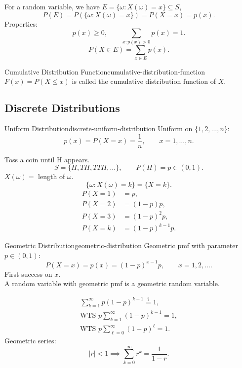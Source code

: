 For a random variable, we have $E=\{\omega:X(\omega)=x\}\subseteq S$,
\[
  P(E)=P(\{\omega:X(\omega)=x\})=P(X=x)=p(x).
\]
Properties:
\[
  p(x)\ge0,\qquad\sum_{x:p(x)>0}p(x)=1.
\]
\[
  P(X\in E)=\sum_{x\in E}p(x).
\]

\begin{definition}{Cumulative Distribution Function}{cumulative-distribution-function}
  $F(x)=P(X\le x)$ is called the cumulative distribution function of $X$.
\end{definition}

\subsection{Discrete Distributions}

\begin{definition}{Uniform Distribution}{discrete-uniform-distribution}
  Uniform on $\{1,2,\ldots,n\}$:
  \[
    p(x)=P(X=x)=\frac1n,\qquad x=1,\ldots,n.
  \]
\end{definition}

\begin{example}
  Toss a coin until H appears.
  \[
    S=\{H,TH,TTH,\ldots\},\qquad P(H)=p\in(0,1).
  \]
  $X(\omega)=$ length of $\omega$.
  \[
    \{\omega:X(\omega)=k\}=\{X=k\}.
  \]
  \begin{align*}
    P(X=1) & =p,            \\
    P(X=2) & =(1-p)p,       \\
    P(X=3) & =(1-p)^2p,     \\
    P(X=k) & =(1-p)^{k-1}p.
  \end{align*}
\end{example}

\begin{definition}{Geometric Distribution}{geometric-distribution}
  Geometric pmf with parameter $p\in(0,1)$:
  \[
    P(X=x)=p(x)=(1-p)^{x-1}p,\qquad x=1,2,\ldots.
  \]
  First success on $x$.\\
  A random variable with geometric pmf is a geometric random variable.
\end{definition}

\begin{gather*}
  \sum_{k=1}^{\infty}p(1-p)^{k-1}\stackrel{?}{=}1,\\
  \text{WTS }p\sum_{k=1}^{\infty}(1-p)^{k-1}=1,\\
  \text{WTS }p\sum_{\ell=0}^{\infty}(1-p)^\ell=1.
\end{gather*}
Geometric series:
\[
  |r|<1\implies\sum_{k=0}^{\infty}r^k=\frac1{1-r}.
\]

